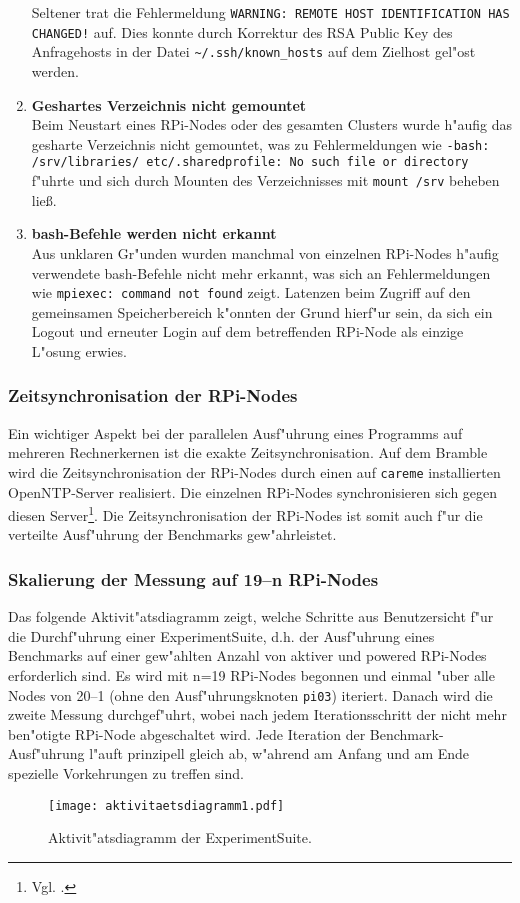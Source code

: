 \begin{enumerate}
Seltener trat die Fehlermeldung \texttt{WARNING: REMOTE HOST IDENTIFICATION HAS CHAN\-GED!} auf. Dies konnte durch Korrektur des RSA Public Key des Anfragehosts in der Datei \texttt{\textasciitilde/.ssh/known\_hosts} auf dem Zielhost gel"ost werden. 
	\item \textbf{Geshartes Verzeichnis nicht gemountet}\\
Beim Neustart eines RPi-Nodes oder des gesamten Clusters wurde h"aufig das gesharte Verzeichnis nicht gemountet, was zu Fehlermeldungen wie \texttt{-bash: /srv/libraries/ etc/.sharedprofile: No such file or directory} f"uhrte und sich durch Mounten des Verzeichnisses mit \texttt{mount /srv} beheben lie\ss .
	\item \textbf{bash-Befehle werden nicht erkannt}\\
Aus unklaren Gr"unden wurden manchmal von einzelnen RPi-Nodes h"aufig verwendete bash-Befehle nicht mehr erkannt, was sich an Fehlermeldungen wie \texttt{mpiexec: command not found} zeigt. Latenzen beim Zugriff auf den gemeinsamen Speicherbereich k"onnten der Grund hierf"ur sein, da sich ein Logout und erneuter Login auf dem betreffenden RPi-Node als einzige L"osung erwies. 
\end{enumerate}

\subsubsection{Zeitsynchronisation der RPi-Nodes} 

Ein wichtiger Aspekt bei der parallelen Ausf"uhrung eines Programms auf mehreren Rechnerkernen ist die exakte Zeitsynchronisation. Auf dem Bramble wird die Zeitsynchronisation der RPi-Nodes durch einen auf \texttt{careme} installierten OpenNTP-Server realisiert. Die einzelnen RPi-Nodes synchronisieren sich gegen diesen Server\footnote{Vgl. \cite{kli13}.}. Die Zeitsynchronisation der RPi-Nodes ist somit auch f"ur die verteilte Ausf"uhrung der Benchmarks gew"ahrleistet.

\subsubsection{Skalierung der Messung auf 19--n RPi-Nodes} 

Das folgende Aktivit"atsdiagramm zeigt, welche Schritte aus Benutzersicht f"ur die Durchf"uhr\-ung einer ExperimentSuite, d.h. der Ausf"uhrung eines Benchmarks auf einer gew"ahlten Anzahl von aktiver und powered RPi-Nodes erforderlich sind. Es wird mit n=19 RPi-Nodes begonnen und einmal "uber alle Nodes von 20--1 (ohne den Ausf"uhrungsknoten \texttt{pi03}) iteriert. Danach wird die zweite Messung durchgef"uhrt, wobei nach jedem Iterationsschritt der nicht mehr ben"otigte RPi-Node abgeschaltet wird. Jede Iteration der Benchmark-Ausf"uhrung l"auft prinzipell gleich ab, w"ahrend am Anfang und am Ende spezielle Vorkehrungen zu treffen sind. 
\begin{figure}[htb]
  \centering
  \texttt{[image: aktivitaetsdiagramm1.pdf]}\\ 
  \caption{Aktivit"atsdiagramm der ExperimentSuite.}
  \label{fig:Aktivitaetsdiagramm}
\end{figure}

